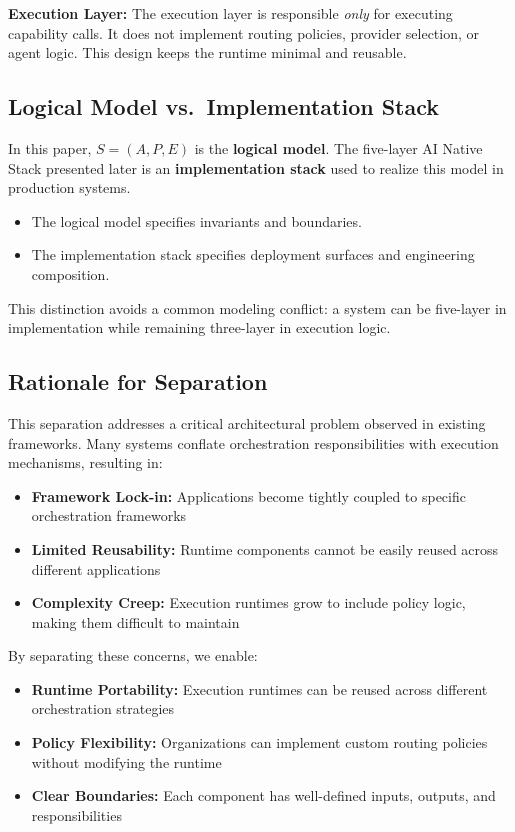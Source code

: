 \textbf{Execution Layer:} The execution layer is responsible \emph{only} for executing capability calls. It does not implement routing policies, provider selection, or agent logic. This design keeps the runtime minimal and reusable.

\subsection{Logical Model vs.\ Implementation Stack}

In this paper, $S = (A, P, E)$ is the \textbf{logical model}. The five-layer AI Native Stack presented later is an \textbf{implementation stack} used to realize this model in production systems.
\begin{itemize}
    \item The logical model specifies invariants and boundaries.
    \item The implementation stack specifies deployment surfaces and engineering composition.
\end{itemize}

This distinction avoids a common modeling conflict: a system can be five-layer in implementation while remaining three-layer in execution logic.

\subsection{Rationale for Separation}

This separation addresses a critical architectural problem observed in existing frameworks. Many systems conflate orchestration responsibilities with execution mechanisms, resulting in:
\begin{itemize}
    \item \textbf{Framework Lock-in:} Applications become tightly coupled to specific orchestration frameworks
    \item \textbf{Limited Reusability:} Runtime components cannot be easily reused across different applications
    \item \textbf{Complexity Creep:} Execution runtimes grow to include policy logic, making them difficult to maintain
\end{itemize}

By separating these concerns, we enable:
\begin{itemize}
    \item \textbf{Runtime Portability:} Execution runtimes can be reused across different orchestration strategies
    \item \textbf{Policy Flexibility:} Organizations can implement custom routing policies without modifying the runtime
    \item \textbf{Clear Boundaries:} Each component has well-defined inputs, outputs, and responsibilities
\end{itemize}
